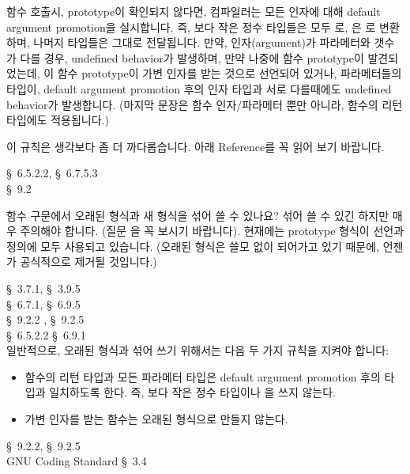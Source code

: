 \begin{faq}
\T
	함수 호출시, prototype이 확인되지 않다면, 컴파일러는 모든 인자에 대해
        default argument promotion을 실시합니다. 즉, 보다 작은
        정수 타입들은 모두 로, 은 로 변환하며,
        나머지 타입들은 그대로 전달됩니다.  만약, 
        인자(argument)가 파라메터와 갯수가 다를 경우, undefined behavior가
        발생하며, 만약 나중에 함수 prototype이 발견되었는데, 이 함수 
        prototype이 가변 인자를 받는 것으로 선언되어 있거나, 파라메터들의
        타입이, default argument promotion 후의 인자 타입과 서로 다를때에도
        undefined behavior가 발생합니다. (마지막 문장은 함수 인자/파라메터 뿐만
        아니라, 함수의 리턴 타입에도 적용됩니다.)
        
        이 규칙은 생각보다 좀 더 까다롭습니다. 아래 Reference를 꼭 읽어 보기
        바랍니다.

        \cite{c99} \S\ 6.5.2.2, \S\ 6.7.5.3 \\
        \cite{hs5} \S\ 9.2
\end{faq}

\begin{faq}
	함수 구문에서 오래된 형식과 새 형식을 섞어 쓸 수 있나요?
\A
	섞어 쓸 수 있긴 하지만 매우 주의해야 합니다.  (질문 을 꼭
	보시기 바랍니다).  현재에는 prototype 형식이 선언과 정의에 모두
	사용되고 있습니다.  (오래된 형식은 쓸모 없이 되어가고 있기 때문에,
	언젠가 공식적으로 제거될 것입니다.)

\R
	\cite{ansi} \S\ 3.7.1, \S\ 3.9.5 \\
	\cite{c89} \S\ 6.7.1, \S\ 6.9.5 \\
	\cite{hs} \S\ 9.2.2 , \S\ 9.2.5  \\

	\cite{c99} \S\ 6.5.2.2 \S\ 6.9.1 \\
\T
        일반적으로, 오래된 형식과 섞어 쓰기 위해서는 다음 두 가지 규칙을
        지켜야 합니다:
        \begin{itemize}
          \item 함수의 리턴 타입과 모든 파라메터 타입은 default argument
            promotion 후의 타입과 일치하도록 한다. 즉, 보다 작은
            정수 타입이나 을 쓰지 않는다.
          \item 가변 인자를 받는 함수는 오래된 형식으로 만들지 않는다.
        \end{itemize}

\R
	\cite{hs5} \S\ 9.2.2,  \S\ 9.2.5  \\
        GNU Coding Standard \S\ 3.4 
\end{faq}

